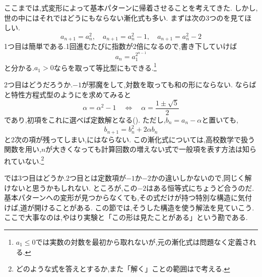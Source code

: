 ここまでは,式変形によって基本パターンに帰着させることを考えてきた.
しかし,世の中にはそれではどうにもならない漸化式も多い.
まずは次の3つのを見てほしい.
\[
  a_{n+1}=a_n^2,
  \quad
  a_{n+1}=a_n^2-1,
  \quad
  a_{n+1}=a_n^2-2
\]
1つ目は簡単である.1回進むたびに指数が2倍になるので,書き下していけば
\[
  a_n=a_1^{2^{n-1}}
\]
と分かる.$a_1>0$ならを取って等比型にもできる.\footnote{$a_1\le0$では実数の対数を最初から取れないが,元の漸化式は問題なく定義される.}

2つ目はどうだろうか.$-1$が邪魔をして,対数を取っても和の形にならない.
ならばと特性方程式型のようにを求めてみると
\[
  \alpha=\alpha^2-1
  \quad\Longleftrightarrow\quad
  \alpha=\frac{1\pm\sqrt5}{2}
\]
であり,初項をこれに選べば定数解となる().
ただし,$b_n=a_n-\alpha$と置いても,
\[
  b_{n+1}=b_n^2+2\alpha b_n
\]
と2次の項が残ってしまい,にはならない.
この漸化式については,高校数学で扱う関数を用い,$n$が大きくなっても計算回数の増えない式で一般項を表す方法は知られていない.\footnote{どのような式を答えとするか,また「解く」ことの範囲はで考える.}

では3つ目はどうか.2つ目とは定数項が$-1$か$-2$かの違いしかないので,同じく解けないと思うかもしれない.
ところが,この$-2$はある恒等式にちょうど合うのだ.
基本パターンへの変形が見つからなくても,その式だけが持つ特別な構造に気付けば,道が開けることがある.
この節では,そうした構造を使う解法を見ていこう.
ここで大事なのは,やはり実験と「この形は見たことがある」という勘である.
